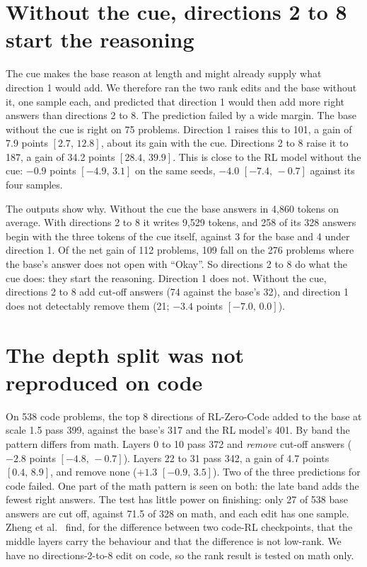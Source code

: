 \documentclass[10pt]{article}
\newcommand{\ci}[2]{$[#1,\,#2]$}
\begin{document}
\section{Without the cue, directions 2 to 8 start the reasoning}
\label{sec:nocue}

The cue makes the base reason at length and might already supply what direction 1 would add. We therefore ran the two rank edits and the base without it, one
sample each, and predicted that direction 1 would then add more right answers than directions 2 to 8. The
prediction failed by a wide margin. The base without the cue is right on 75 problems. Direction 1 raises this
to 101, a gain of 7.9 points \ci{2.7}{12.8}, about its gain with the cue. Directions 2 to 8 raise it to 187, a
gain of 34.2 points \ci{28.4}{39.9}. This is close to the RL model without the cue: $-0.9$ points
\ci{-4.9}{3.1} on the same seeds, $-4.0$ \ci{-7.4}{-0.7} against its four samples.

The outputs show why. Without the cue the base answers in 4{,}860 tokens on average. With directions 2 to 8 it writes 9{,}529 tokens, and 258 of its 328 answers begin with the
three tokens of the cue itself, against 3 for the base and 4 under direction 1. Of the net gain of 112
problems, 109 fall on the 276 problems where the base's answer does not open with ``Okay''. So
directions 2 to 8 do what the cue does: they start the reasoning. Direction 1 does not. Without the cue, directions 2 to 8 add cut-off
answers (74 against the base's 32), and direction 1 does not detectably remove them (21; $-3.4$ points
\ci{-7.0}{0.0}).

\section{The depth split was not reproduced on code}

On 538 code problems, the top 8 directions of RL-Zero-Code added to the base at scale 1.5 pass 399, against
the base's 317 and the RL model's 401. By band the pattern differs from math. Layers 0 to 10 pass 372 and
\emph{remove} cut-off answers ($-2.8$ points \ci{-4.8}{-0.7}). Layers 22 to 31 pass 342, a gain of 4.7 points
\ci{0.4}{8.9}, and remove none ($+1.3$ \ci{-0.9}{3.5}). Two of the three predictions for code failed. One part
of the math pattern is seen on both: the late band adds the fewest right answers. The test has little power
on finishing: only 27 of 538 base answers are cut off, against 71.5 of 328 on math, and each edit has one
sample. Zheng et al.\ \cite{zheng2026correctness} find, for the difference between two code-RL checkpoints,
that the middle layers carry the behaviour and that the difference is not low-rank. We have no
directions-2-to-8 edit on code, so the rank result is tested on math only.
\end{document}
